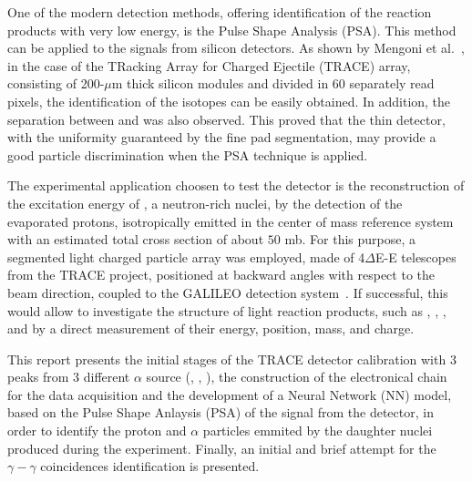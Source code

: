 One of the modern detection methods, offering identification of the reaction
products with very low energy, is the Pulse Shape Analysis (PSA). This method
can be applied to the signals from silicon detectors. As shown by Mengoni et
al.~\cite{mengoni}, in the case of the TRacking Array for Charged Ejectile (TRACE) array, consisting
of 200-$\mu$m thick silicon modules and divided in 60 separately read pixels,
the identification of the  isotopes can be easily obtained.
In addition, the separation between  and  was also
observed. This proved that the thin detector, with the uniformity guaranteed
by the fine pad segmentation, may provide a good particle discrimination when
the PSA technique is applied.

\bigbreak

The experimental application choosen to test the detector is the reconstruction of the excitation energy of ,
a neutron-rich nuclei, by the detection of the evaporated protons,
isotropically emitted in the center of mass reference system with an estimated total cross section of about $50$ mb. For this purpose, a segmented light
charged particle array was employed, made of 4$\Delta$E-E telescopes from the
TRACE project, positioned at backward angles with respect to
the beam direction, coupled to the GALILEO detection system~\cite{galileo}.
If successful, this would allow to investigate the structure of light reaction
products, such as , , ,  and  by a direct
measurement of their energy, position, mass, and charge.

\bigbreak

This report presents the initial stages of the TRACE detector calibration
with 3 peaks from 3 different $\alpha$ source (, ,
), the construction of the electronical chain for the data
acquisition and the development of a Neural Network (NN) model, based on the
Pulse Shape Anlaysis (PSA) of the signal from the detector, in order to
identify the proton and $\alpha$ particles emmited by the daughter nuclei
produced during the experiment. Finally, an initial and brief attempt for the
$\gamma-\gamma$ coincidences identification is presented.